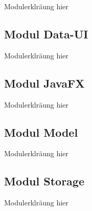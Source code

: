 Modulerklräung hier




\subsection{Modul Data-UI}
\label{mod_data-ui}

Modulerklräung hier




\subsection{Modul JavaFX}
\label{mod_javafx}

Modulerklräung hier




\subsection{Modul Model}
\label{mod_model}

Modulerklräung hier




\subsection{Modul Storage}
\label{mod_storage}

Modulerklräung hier

